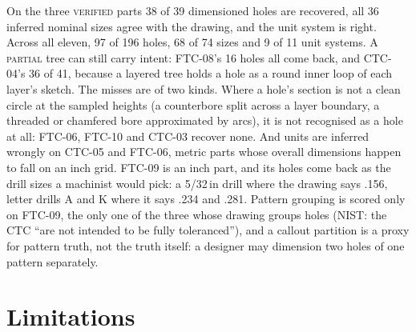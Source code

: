 \documentclass[11pt]{article}
\newcommand{\VERIFIED}{\textsc{verified}}
\newcommand{\PARTIAL}{\textsc{partial}}
\begin{document}
On the three \VERIFIED{} parts 38 of 39 dimensioned holes are recovered, all
36 inferred nominal sizes agree with the drawing, and the unit system is right.
Across all eleven, 97 of 196 holes, 68 of 74 sizes and 9 of 11 unit systems. A
\PARTIAL{} tree can still carry intent: FTC-08's 16 holes all come back, and
CTC-04's 36 of 41, because a layered tree holds a hole as a round inner loop of
each layer's sketch. The misses are of two kinds. Where a hole's section is
not a clean circle at the sampled heights (a counterbore split across a layer
boundary, a threaded or chamfered bore approximated by arcs), it is not
recognised as a hole at all: FTC-06, FTC-10 and CTC-03 recover none. And units
are inferred wrongly on CTC-05 and FTC-06, metric parts whose overall dimensions
happen to fall on an inch grid. FTC-09 is
an inch part, and its holes come back as the drill sizes a machinist would pick:
a 5/32\,in drill where the drawing says .156, letter drills A and K where it
says .234 and .281. Pattern grouping is scored only on FTC-09, the only one of
the three whose drawing groups holes (NIST: the CTC ``are not intended to be
fully toleranced''), and a callout partition is a proxy for pattern truth, not
the truth itself: a designer may dimension two holes of one pattern separately.

\section{Limitations}
\label{sec:limits}
\end{document}
